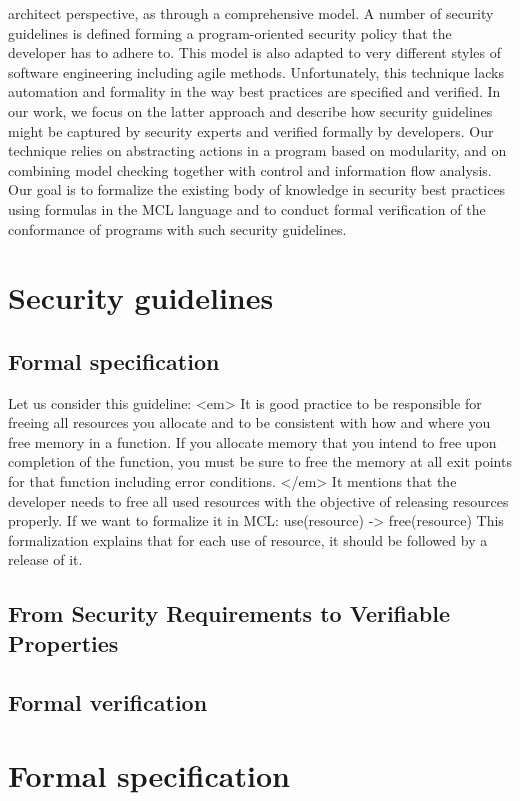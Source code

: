 \documentclass[10pt]{article}
\begin{document}
architect perspective, as through a comprehensive model. A number of security guidelines is
defined forming a program-oriented security policy that the developer has to adhere to. This
model is also adapted to very different styles of software engineering including agile methods.
Unfortunately, this technique lacks automation and formality in the way best practices are
specified and verified.
In our work, we focus on the latter approach and describe how security guidelines might
be captured by security experts and verified formally by developers. Our technique relies
on abstracting actions in a program based on modularity, and on combining model checking
together with control and information flow analysis. Our goal is to formalize the existing
body of knowledge in security best practices using formulas in the MCL language and to
conduct formal verification of the conformance of programs with such security guidelines.
\section{Security guidelines}
\subsection {Formal specification}
Let us consider this guideline:
<em> It is good practice to be responsible for freeing all resources you allocate and to be consistent with how and where you free memory in a function. If you allocate memory that you intend to free upon completion of the function, you must be sure to free the memory at all exit points for that function including error conditions.
 </em> \cite{https://cwe.mitre.org/data/definitions/404.html}
It mentions that the developer needs to free all used resources with the objective of releasing resources properly.
If we want to formalize it in MCL:
use(resource) -> free(resource)
This formalization explains that for each use of resource, it should be followed by a release of it.

\subsection {From Security Requirements to Verifiable Properties}
\subsection {Formal verification}
\section{Formal specification}
\end{document}
